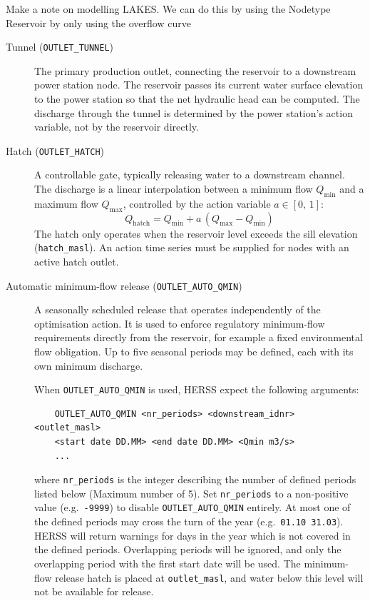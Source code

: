 \documentclass[a4paper, 12pt]{report}
\begin{document}
	Make a note on modelling LAKES. We can do this by using the Nodetype Reservoir by only using the overflow curve 
	
	

	\begin{description}
	
	\item[Tunnel (\texttt{OUTLET\_TUNNEL})] The primary production outlet, connecting the
	reservoir to a downstream power station node. The reservoir passes its current water
	surface elevation to the power station so that the net hydraulic head can be computed.
	The discharge through the tunnel is determined by the power station's action variable,
	not by the reservoir directly.
	
	\item[Hatch (\texttt{OUTLET\_HATCH})] A controllable gate, typically releasing water to a
	downstream channel. The discharge is a linear interpolation between a minimum flow
	$Q_\mathrm{min}$ and a maximum flow $Q_\mathrm{max}$, controlled by the action
	variable $a \in [0,\,1]$:
	$$Q_\mathrm{hatch} = Q_\mathrm{min} + a\,(Q_\mathrm{max} - Q_\mathrm{min})$$
	The hatch only operates when the reservoir level exceeds the sill elevation
	(\texttt{hatch\_masl}). An action time series must be supplied for nodes with an
	active hatch outlet.
	
	\item[Automatic minimum-flow release (\texttt{OUTLET\_AUTO\_QMIN})] A seasonally
	scheduled release that operates independently of the optimisation action. It is used
	to enforce regulatory minimum-flow requirements directly from the reservoir, for
	example a fixed environmental flow obligation. Up to five seasonal periods may be
	defined, each with its own minimum discharge.

    When \texttt{OUTLET\_AUTO\_QMIN} is used, HERSS expect the following arguments:
    \begin{verbatim}
    OUTLET_AUTO_QMIN <nr_periods> <downstream_idnr> <outlet_masl>
    <start date DD.MM> <end date DD.MM> <Qmin m3/s>
    ...
    \end{verbatim}
    where \texttt{nr\_periods} is the integer describing the number of defined periods listed
    below (Maximum number of 5). Set \texttt{nr\_periods} to a non-positive value (e.g.\
    \texttt{-9999}) to disable \texttt{OUTLET\_AUTO\_QMIN} entirely. At most one of the defined periods may
    cross the turn of the year (e.g.\ \texttt{01.10 31.03}). HERSS will return warnings for days in the year which is not covered in the defined periods.  Overlapping periods will be ignored, and only the overlapping period with the first start date will be used. The minimum-flow release hatch is placed at \texttt{outlet\_masl}, and water below this level will not be available for release.
	

\end{description}
\end{document}

